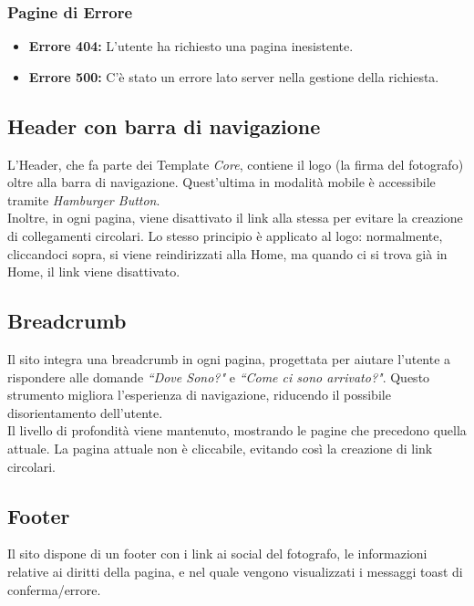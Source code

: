 \subsubsection{Pagine di Errore}
\begin{itemize}
    \item \textbf{Errore 404:} L'utente ha richiesto una pagina inesistente.
    \item \textbf{Errore 500:} C'\`e stato un errore lato server nella gestione della richiesta.
\end{itemize}
\subsection{Header con barra di navigazione}
L'Header, che fa parte dei Template \textit{Core}, contiene il logo (la firma del fotografo) oltre alla barra di navigazione. Quest'ultima in modalit\`a mobile \`e accessibile tramite \textit{Hamburger Button}.\\
Inoltre, in ogni pagina, viene disattivato il link alla stessa per evitare la creazione di collegamenti circolari. Lo stesso principio è applicato al logo: normalmente, cliccandoci sopra, si viene reindirizzati alla Home, ma quando ci si trova già in Home, il link viene disattivato.
\subsection{Breadcrumb}
Il sito integra una breadcrumb in ogni pagina, progettata per aiutare l'utente a rispondere alle domande  \textit{``Dove Sono?"} e \textit{``Come ci sono arrivato?"}. Questo strumento migliora l'esperienza di navigazione, riducendo il possibile disorientamento dell'utente.\\
Il livello di profondità viene mantenuto, mostrando le pagine che precedono quella attuale. La pagina attuale non è cliccabile, evitando così la creazione di link circolari.
\subsection{Footer}
Il sito dispone di un footer con i link ai social del fotografo, le informazioni relative ai diritti della pagina, 
e nel quale vengono visualizzati i messaggi toast di conferma/errore.